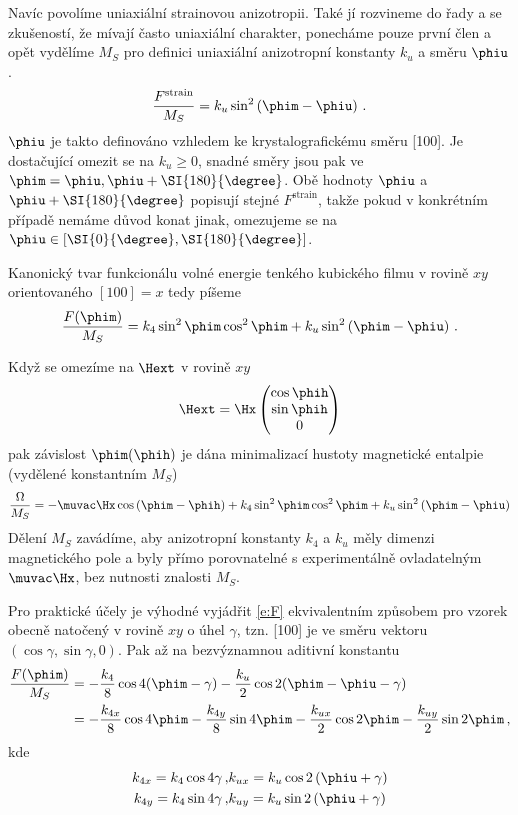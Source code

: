 Navíc povolíme uniaxiální strainovou anizotropii.
Také jí rozvineme do řady a se zkušeností, že mívají často uniaxiální charakter, ponecháme pouze první člen a opět vydělíme $M_S$ pro definici uniaxiální anizotropní konstanty $k_u$ a směru $\phiu$.
\begin{equation}
\frac{F^\textrm{strain}}{M_S}=k_u \sin^2\left( \phim-\phiu  \right) \,.
\end{equation}
$\phiu$ je takto definováno vzhledem ke krystalografickému směru [100].
Je dostačující omezit se na $k_u\geq 0$, snadné směry jsou pak ve $\phim=\phiu, \phiu+\SI{180}{\degree}$.
Obě hodnoty $\phiu$ a $\phiu+\SI{180}{\degree}$ popisují stejné $F^\textrm{strain}$, takže pokud v konkrétním případě nemáme důvod konat jinak, omezujeme se na $\phiu \in [\SI{0}{\degree}, \SI{180}{\degree}]$.

Kanonický tvar funkcionálu volné energie tenkého kubického filmu v rovině $xy$ orientovaného $[100]=x$ tedy píšeme
\begin{equation} \label{e:F}
\frac{F(\phim)}{M_S}=k_4 \sin^2 \phim \cos^2 \phim + k_u \sin^2\left( \phim-\phiu  \right) \,.
\end{equation}

Když se omezíme na $\Hext$ v rovině $xy$
\begin{equation}
\Hext =\Hx \begin{pmatrix} \cos \phih \\ \sin \phih \\ 0 \end{pmatrix}
\end{equation}
pak závislost $\phim(\phih)$ je dána minimalizací hustoty magnetické entalpie (vydělené konstantním $M_S$)
\begin{equation}
\frac{\Omega}{M_S}=-\muvac \Hx \cos \left(\phim-\phih \right) + k_4 \sin^2 \phim \cos^2 \phim + k_u \sin^2\left( \phim-\phiu  \right)
\end{equation}
Dělení $M_S$ zavádíme, aby anizotropní konstanty $k_4$ a $k_u$ měly dimenzi magnetického pole a byly přímo porovnatelné s experimentálně ovladatelným $\muvac\Hx$, bez nutnosti znalosti $M_S$.

Pro praktické účely je výhodné vyjádřit \eqref{e:F} ekvivalentním způsobem pro vzorek obecně natočený v rovině $xy$ o úhel $\gamma$, tzn. [100] je ve směru vektoru $(\cos\gamma, \sin\gamma, 0)$.
Pak až na bezvýznamnou aditivní konstantu
\begin{align}
\frac{F(\phim)}{M_S}&=-\frac{k_4}{8} \cos 4(\phim-\gamma)-\frac{k_u}{2} \cos 2(\phim-\phiu-\gamma) \\
&=-\frac{k_{4x}}{8} \cos 4\phim - \frac{k_{4y}}{8} \sin 4\phim - \frac{k_{ux}}{2} \cos 2 \phim - \frac{k_{uy}}{2} \sin 2 \phim \,,
\end{align}
kde
\begin{eqnarray}
k_{4x}=k_4 \cos 4\gamma \,, & k_{ux}=k_u \cos 2 \left(\phiu+\gamma\right)\\
k_{4y}=k_4 \sin 4\gamma \,, & k_{uy}=k_u \sin 2 \left(\phiu+\gamma\right)
\end{eqnarray}


